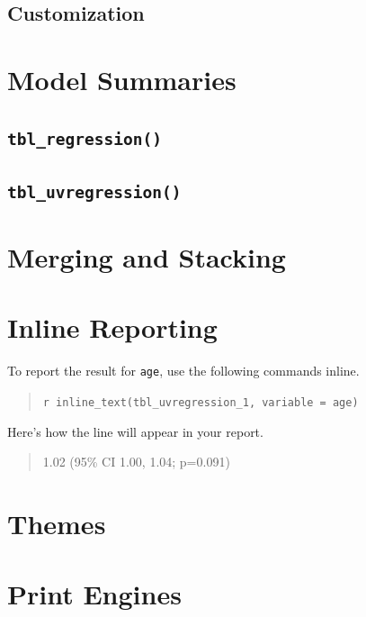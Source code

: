 \documentclass[
]{article}
\begin{document}
\hypertarget{customization}{%
\subsection{Customization}\label{customization}}

\hypertarget{model-summaries}{%
\section{Model Summaries}\label{model-summaries}}

\hypertarget{tbl_regression}{%
\subsection{\texorpdfstring{\texttt{tbl\_regression()}}{tbl\_regression()}}\label{tbl_regression}}

\hypertarget{tbl_uvregression}{%
\subsection{\texorpdfstring{\texttt{tbl\_uvregression()}}{tbl\_uvregression()}}\label{tbl_uvregression}}

\hypertarget{merging-and-stacking}{%
\section{Merging and Stacking}\label{merging-and-stacking}}

\hypertarget{inline-reporting}{%
\section{Inline Reporting}\label{inline-reporting}}

To report the result for \texttt{age}, use the following commands
inline.

\begin{quote}
\texttt{\textasciigrave{}r\ inline\_text(tbl\_uvregression\_1,\ variable\ =\ age)\textasciigrave{}}
\end{quote}

Here's how the line will appear in your report.

\begin{quote}
1.02 (95\% CI 1.00, 1.04; p=0.091)
\end{quote}

\hypertarget{themes}{%
\section{Themes}\label{themes}}

\hypertarget{print-engines}{%
\section{Print Engines}\label{print-engines}}
\end{document}
